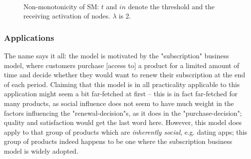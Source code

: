 \documentclass[twocolumn, 10pt]{article}
\begin{document}
\begin{figure}
 \\
\caption{Non-monotonicity of SM: $t$ and $in$ denote the threshold and the receiving activation of nodes. $\lambda$ is 2.}
\label{fig:SM1}
\end{figure}
\subsubsection{Applications}
The name says it all: the model is motivated by the "subscription" business model, where customers purchase [access to] a product for a limited amount of time and decide whether they would want to renew their subscription at the end of each period. Claiming that this model is in all practicality applicable to this application might seem a bit far-fetched at first -- this is in fact far-fetched for many products, as social influence does not seem to have much weight in the factors influencing the "renewal-decision"s, as it does in the "purchase-decision"; quality and satisfaction would get the last word here. However, this model does apply to that group of products which are \textit{inherently social}, e.g. dating apps; this group of products indeed happens to be one where the subscription business model is widely adopted.
\end{document}
